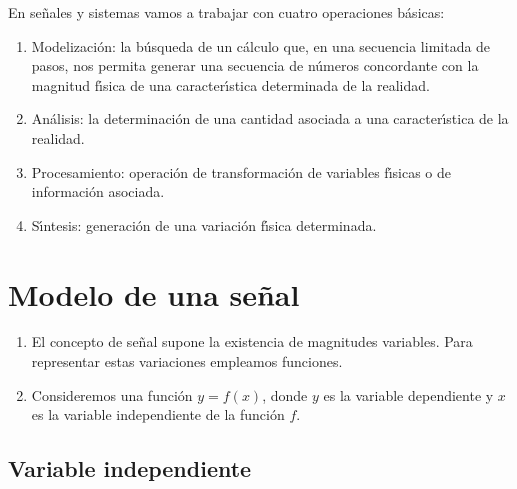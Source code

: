 En señales y sistemas vamos a trabajar con cuatro operaciones b\'{a}sicas:
\begin{enumerate}
	\item Modelizaci\'{o}n: la b\'{u}squeda de un c\'{a}lculo que, en una secuencia limitada de pasos, nos permita generar una secuencia de n\'{u}meros concordante con la magnitud f\'{\i}sica de una caracter\'{\i}stica determinada de la realidad.
	\item An\'{a}lisis: la determinaci\'{o}n de una cantidad asociada a una caracter\'{\i}stica de la realidad.
	\item Procesamiento: operaci\'{o}n de transformaci\'{o}n de variables f\'{\i}sicas o de informaci\'{o}n asociada.
	\item S\'{\i}ntesis: generaci\'{o}n de una variaci\'{o}n f\'{\i}sica determinada.
\end{enumerate}


\section{Modelo de una se\~{n}al}

\begin{enumerate}
\item El concepto de se\~{n}al supone la existencia de
magnitudes variables. Para representar estas variaciones empleamos
funciones.

\item Consideremos una funci\'{o}n $y = f(x)$, donde $y$ es la
variable dependiente y $x$ es la variable independiente de la
funci\'{o}n $f$.

\end{enumerate}

\subsection{Variable independiente}

